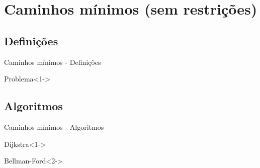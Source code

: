 \section{Caminhos mínimos (sem restrições)}

\subsection{Definições}
\begin{frame}{Caminhos mínimos - Definições}
  \begin{block}{Problema}<1->
  \end{block}
\end{frame}

\subsection{Algoritmos}
\begin{frame}{Caminhos mínimos - Algoritmos}
  \begin{block}{Dijkstra}<1->
  \end{block}
  \begin{block}{Bellman-Ford}<2->
  \end{block}
\end{frame}

